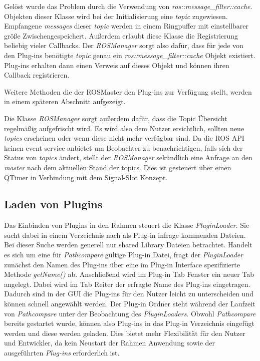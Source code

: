 Gelöst wurde das Problem durch die Verwendung von
\textit{ros::message\_filter::cache}. Objekten dieser Klasse wird bei der
Initialisierung eine \textit{topic} zugewiesen. Empfangene \textit{messages}
dieser \textit{topic} werden in einem Ringpuffer mit einstellbarer größe Zwischengespeichert.
Außerdem erlaubt diese Klasse die Registrierung beliebig vieler Callbacks.
Der \textit{ROSManager} sorgt also dafür, dass für jede von den Plug-ins
benötigte \textit{topic} genau ein \textit{ros::message\_filter::cache} Objekt
existiert. Plug-ins erhalten dann einen Verweis auf dieses Objekt und können
ihren Callback registrieren.

Weitere Methoden die der ROSMaster den Plug-ins zur Verfügung stellt, werden in einem
späteren Abschnitt aufgezeigt.

Die Klasse \textit{ROSManager} sorgt außerdem dafür, dass die Topic Übersicht
regelmäßig aufgefrischt wird. Es wird also dem Nutzer ersichtlich, sollten neue
\textit{topics} erscheinen oder wenn diese nicht mehr verfügbar sind.
Da die \gls{ROS} \gls{API} keinen event service anbietet um Beobachter zu benachrichtigen,
falls sich der Status von \textit{topics} ändert, stellt der
\textit{ROSManager} sekündlich eine Anfrage an den \textit{master} nach dem
aktuellen Stand der topics.  Dies ist gesteuert über einen QTimer in Verbindung
mit dem Signal-Slot Konzept.


\subsection{Laden von Plugins}
Das Einbinden von Plugins in den Rahmen steuert die Klasse
\textit{PluginLoader}. Sie sucht dabei in einem Verzeichnis nach als Plug-in
infrage kommenden Dateien. Bei dieser Suche werden generell nur shared Library
Dateien betrachtet. Handelt es sich um eine für \textit{Pathcompare} gültige
Plug-in Datei, fragt der \textit{PluginLoader} zunächst den Namen des Plug-ins
über eine im Plug-in Interface spezifizierte Methode \textit{getName()} ab.
Anschließend wird im Plug-in Tab Fenster ein neuer Tab angelegt. Dabei wird im
Tab Reiter der erfragte Name des Plug-ins eingetragen. Dadurch sind in der GUI die Plug-ins für den
Nutzer leicht zu unterscheiden und können schnell angewählt werden.
Der Plug-in Ordner steht während der Laufzeit von \textit{Pathcompare}
unter der Beobachtung des \textit{PluginLoaders}. 
Obwohl \textit{Pathcompare} bereits gestartet wurde, können also Plug-ins in das Plug-in
Verzeichnis eingefügt werden und diese werden geladen. Dies bietet mehr Flexibilität für den
Nutzer und Entwickler, da kein Neustart der Rahmen Anwendung sowie der ausgeführten
\textit{Plug-ins} erforderlich ist.


